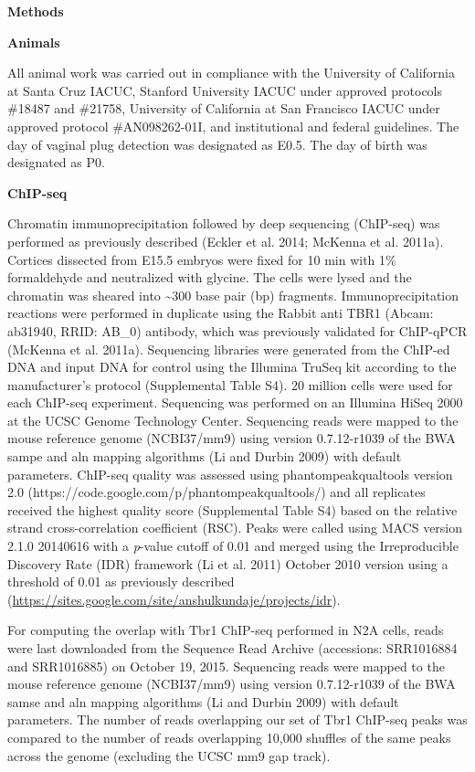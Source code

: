 \documentclass[]{article}
\begin{document}
\textbf{Methods}

\textbf{Animals}

All animal work was carried out in compliance with the University of
California at Santa Cruz IACUC, Stanford University IACUC under approved
protocols \#18487 and \#21758, University of California at San Francisco
IACUC under approved protocol \#AN098262-01I, and institutional and
federal guidelines. The day of vaginal plug detection was designated as
E0.5. The day of birth was designated as P0.

\textbf{ChIP-seq}

Chromatin immunoprecipitation followed by deep sequencing (ChIP-seq) was
performed as previously described (Eckler et al. 2014; McKenna et al.
2011a). Cortices dissected from E15.5 embryos were fixed for 10 min with
1\% formaldehyde and neutralized with glycine. The cells were lysed and
the chromatin was sheared into \textasciitilde{}300 base pair (bp)
fragments. Immunoprecipitation reactions were performed in duplicate
using the Rabbit anti TBR1 (Abcam: ab31940, RRID: AB\_0) antibody, which
was previously validated for ChIP-qPCR (McKenna et al. 2011a).
Sequencing libraries were generated from the ChIP-ed DNA and input DNA
for control using the Illumina TruSeq kit according to the
manufacturer's protocol (Supplemental Table S4). 20 million cells were
used for each ChIP-seq experiment. Sequencing was performed on an
Illumina HiSeq 2000 at the UCSC Genome Technology Center. Sequencing
reads were mapped to the mouse reference genome (NCBI37/mm9) using
version 0.7.12-r1039 of the BWA sampe and aln mapping algorithms (Li and
Durbin 2009) with default parameters. ChIP-seq quality was assessed
using phantompeakqualtools version 2.0
(https://code.google.com/p/phantompeakqualtools/) and all replicates
received the highest quality score (Supplemental Table S4) based on the
relative strand cross-correlation coefficient (RSC). Peaks were called
using MACS version 2.1.0 20140616 with a \emph{p}-value cutoff of 0.01
and merged using the Irreproducible Discovery Rate (IDR) framework (Li
et al. 2011) October 2010 version using a threshold of 0.01 as
previously described
(\url{https://sites.google.com/site/anshulkundaje/projects/idr}).

For computing the overlap with Tbr1 ChIP-seq performed in N2A cells,
reads were last downloaded from the Sequence Read Archive (accessions:
SRR1016884 and SRR1016885) on October 19, 2015. Sequencing reads were
mapped to the mouse reference genome (NCBI37/mm9) using version
0.7.12-r1039 of the BWA samse and aln mapping algorithms (Li and Durbin
2009) with default parameters. The number of reads overlapping our set
of Tbr1 ChIP-seq peaks was compared to the number of reads overlapping
10,000 shuffles of the same peaks across the genome (excluding the UCSC
mm9 gap track).
\end{document}
